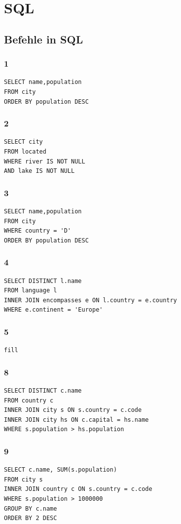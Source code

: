 \section{SQL}
\subsection{Befehle in SQL}
\subsubsection{1}
\begin{lstlisting}
SELECT name,population
FROM city
ORDER BY population DESC
\end{lstlisting}
\subsubsection{2}
\begin{lstlisting}
SELECT city
FROM located
WHERE river IS NOT NULL
AND lake IS NOT NULL
\end{lstlisting}
\subsubsection{3}
\begin{lstlisting}
SELECT name,population
FROM city
WHERE country = 'D'
ORDER BY population DESC
\end{lstlisting}
\subsubsection{4}
\begin{lstlisting}
SELECT DISTINCT l.name 
FROM language l 
INNER JOIN encompasses e ON l.country = e.country
WHERE e.continent = 'Europe'
\end{lstlisting}
\subsubsection{5}
\begin{lstlisting}
fill
\end{lstlisting}
\subsubsection{8}
\begin{lstlisting}
SELECT DISTINCT c.name 
FROM country c
INNER JOIN city s ON s.country = c.code
INNER JOIN city hs ON c.capital = hs.name
WHERE s.population > hs.population
\end{lstlisting}
\subsubsection{9}
\begin{lstlisting}
SELECT c.name, SUM(s.population)
FROM city s
INNER JOIN country c ON s.country = c.code
WHERE s.population > 1000000
GROUP BY c.name
ORDER BY 2 DESC
\end{lstlisting}
